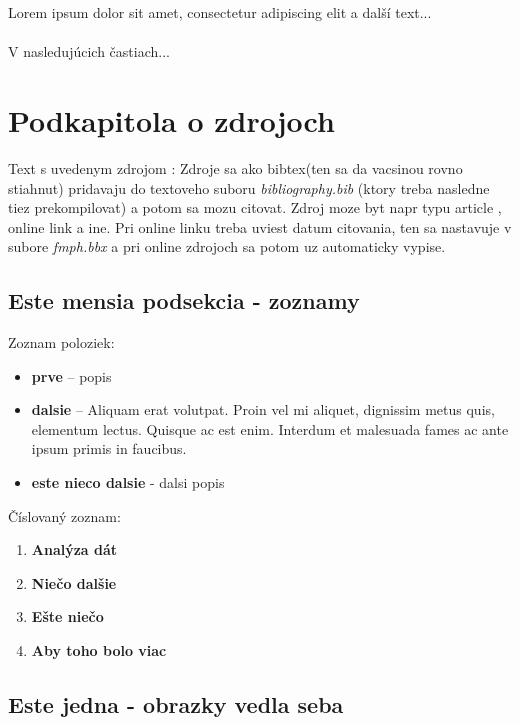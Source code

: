Lorem ipsum dolor sit amet, consectetur adipiscing elit a další text... 
\\\\
V nasledujúcich častiach...

\section{Podkapitola o zdrojoch}
Text s uvedenym zdrojom \cite{vis}:
Zdroje sa ako bibtex(ten sa da vacsinou rovno stiahnut) pridavaju do textoveho suboru \emph{bibliography.bib} (ktory treba nasledne tiez prekompilovat) a potom sa mozu citovat. Zdroj moze byt napr typu article \cite{taxonomia},  online link a ine. Pri online linku \cite{anemone}
treba uviest datum citovania, ten sa nastavuje v subore \emph{fmph.bbx} a pri online zdrojoch sa potom uz automaticky vypise. 
\subsection{Este mensia podsekcia - zoznamy}

Zoznam poloziek:
\begin{itemize}
	\item \textbf{prve} – popis
	\item \textbf{dalsie} – Aliquam erat volutpat. Proin vel mi aliquet, dignissim metus quis, elementum lectus. Quisque ac est enim. Interdum et malesuada fames ac ante ipsum primis in faucibus.
	\item \textbf{este nieco dalsie} - dalsi popis
\end{itemize}

  Číslovaný zoznam:
  \begin{enumerate}
    \item\textbf{Analýza dát}
    \item\textbf{Niečo dalšie}
    \item\textbf{Ešte niečo}
    \item\textbf{Aby toho bolo viac} 
  \end{enumerate}
  
\subsection{Este jedna - obrazky vedla seba}

